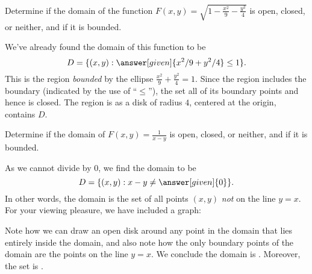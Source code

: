 \documentclass{ximera}
\begin{document}
\begin{example}
  Determine if the domain of the function
  $F(x,y)=\sqrt{1-\frac{x^2}9-\frac{y^2}4}$ is open, closed, or
  neither, and if it is bounded.
  \begin{explanation}
    We've already found the domain of this function to be
    \[
    D = \{(x,y): \answer[given]{x^2/9+y^2/4}\leq 1\}.
    \]
    This is the region \textit{bounded} by the ellipse
    $\frac{x^2}9+\frac{y^2}4=1$. Since the region includes the
    boundary (indicated by the use of ``$\leq$''), the set
    all of its boundary points and hence is closed. The region is
     as a disk
    of radius $4$, centered at the origin, contains $D$.
  \end{explanation}
\end{example}

\begin{example}
  Determine if the domain of $F(x,y) = \frac{1}{x-y}$ is open, closed,
  or neither, and if it is bounded.
  \begin{explanation}
    As we cannot divide by $0$, we find the domain to be
    \[
    D = \{(x,y):x-y\neq \answer[given]{0}\}.
    \]
    In other words, the domain is the set of all points $(x,y)$
    \textit{not} on the line $y=x$. For your viewing pleasure, we have
    included a graph:
    \begin{image}
    \end{image}
    Note how we can draw an open disk around any point in the domain
    that lies entirely inside the domain, and also note how the only
    boundary points of the domain are the points on the line $y=x$. We
    conclude the domain is . Moreover, the set is .
  \end{explanation}
\end{example}
\end{document}
